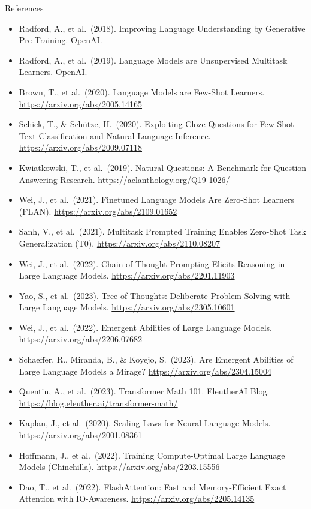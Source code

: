 \begin{vbframe}{References}
\footnotesize
\begin{itemize}
\item Radford, A., et al.\ (2018). Improving Language Understanding by Generative Pre-Training. OpenAI.
\item Radford, A., et al.\ (2019). Language Models are Unsupervised Multitask Learners. OpenAI.
\item Brown, T., et al.\ (2020). Language Models are Few-Shot Learners. \url{https://arxiv.org/abs/2005.14165}
\item Schick, T., \& Sch\"utze, H.\ (2020). Exploiting Cloze Questions for Few-Shot Text Classification and Natural Language Inference. \url{https://arxiv.org/abs/2009.07118}
\item Kwiatkowski, T., et al.\ (2019). Natural Questions: A Benchmark for Question Answering Research. \url{https://aclanthology.org/Q19-1026/}
\item Wei, J., et al.\ (2021). Finetuned Language Models Are Zero-Shot Learners (FLAN). \url{https://arxiv.org/abs/2109.01652}
\item Sanh, V., et al.\ (2021). Multitask Prompted Training Enables Zero-Shot Task Generalization (T0). \url{https://arxiv.org/abs/2110.08207}
\item Wei, J., et al.\ (2022). Chain-of-Thought Prompting Elicits Reasoning in Large Language Models. \url{https://arxiv.org/abs/2201.11903}
\item Yao, S., et al.\ (2023). Tree of Thoughts: Deliberate Problem Solving with Large Language Models. \url{https://arxiv.org/abs/2305.10601}
\item Wei, J., et al.\ (2022). Emergent Abilities of Large Language Models. \url{https://arxiv.org/abs/2206.07682}
\item Schaeffer, R., Miranda, B., \& Koyejo, S.\ (2023). Are Emergent Abilities of Large Language Models a Mirage? \url{https://arxiv.org/abs/2304.15004}
\item Quentin, A., et al.\ (2023). Transformer Math 101. EleutherAI Blog. \url{https://blog.eleuther.ai/transformer-math/}
\item Kaplan, J., et al.\ (2020). Scaling Laws for Neural Language Models. \url{https://arxiv.org/abs/2001.08361}
\item Hoffmann, J., et al.\ (2022). Training Compute-Optimal Large Language Models (Chinchilla). \url{https://arxiv.org/abs/2203.15556}
\item Dao, T., et al.\ (2022). FlashAttention: Fast and Memory-Efficient Exact Attention with IO-Awareness. \url{https://arxiv.org/abs/2205.14135}

\end{itemize}
\end{vbframe}
